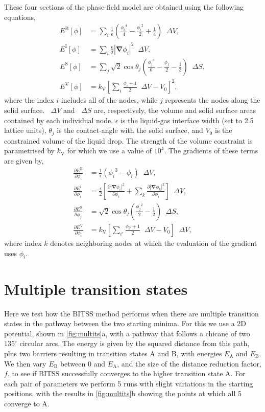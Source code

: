 \documentclass[aip,jcp,11pt]{revtex4-2}
\newcommand{\abs}[1]{\left| #1 \right|}
\newcommand{\grad}{\bm{\nabla}}
\newcommand{\upDelta}{\mathop{}\!\Delta}
\begin{document}
These four sections of the phase-field model are obtained using the following equations,
\begin{align}
  E^\mathrm{B}[\phi] &= \sum_i \frac{1}{\epsilon} \left( \frac{{\phi_i}^4}{4} - \frac{{\phi_i}^2}{2} + \frac{1}{4} \right) \upDelta V,\\
  E^\mathrm{I}[\phi] &= \sum_i \frac{\epsilon}{2} \abs{\grad \phi_i}^2 \upDelta V,\\
  E^\mathrm{S}[\phi] &= \sum_j \sqrt{2}\cos\theta_j \left( \frac{{\phi_j}^3}{6} - \frac{\phi_j}{2} - \frac{1}{3} \right) \upDelta S,\\
  E^\mathrm{V}[\phi] &= k_\mathrm{V} \left[ \sum_i \frac{\phi_i + 1}{2} \upDelta V - V_0 \right]^2,
\end{align}
where the index $i$ includes all of the nodes, while $j$ represents the nodes along the solid surface.
$\upDelta V$ and $\upDelta S$ are, respectively, the volume and solid surface areas contained by each individual node.
$\epsilon$ is the liquid-gas interface width (set to 2.5 lattice units), $\theta_j$ is the contact-angle with the solid surface, and $V_0$ is the constrained volume of the liquid drop.
The strength of the volume constraint is parametrised by $k_\mathrm{V}$ for which we use a value of $10^4$.
The gradients of these terms are given by,
\begin{align}
  \frac{\partial E^\mathrm{B}}{\partial \phi_i} &= \frac{1}{\epsilon} \left( {\phi_i}^3 - \phi_i \right) \upDelta V,\\
  \frac{\partial E^\mathrm{I}}{\partial \phi_i} &= \frac{\epsilon}{2} \left[
    \frac{\partial \abs{\grad \phi_i}^2}{\partial \phi_i} +
    \sum_k\frac{\partial \abs{\grad \phi_k}^2}{\partial \phi_i} \right] \upDelta V,\\
  \frac{\partial E^\mathrm{S}}{\partial \phi_j} &= \sqrt{2}\cos\theta_j \left( \frac{{\phi_j}^2}{2} - \frac{1}{2} \right) \upDelta S,\\
  \frac{\partial E^\mathrm{V}}{\partial \phi_i} &= k_\mathrm{V} \left[ \sum_{i'} \frac{\phi_{i'} + 1}{2} \upDelta V - V_0 \right] \upDelta V,
\end{align}
where index $k$ denotes neighboring nodes at which the evaluation of the gradient uses $\phi_i$.


\section{Multiple transition states}
Here we test how the BITSS method performs when there are multiple transition states in the pathway between the two starting minima.
For this we use a 2D potential, shown in \cref{fig:multits}a, with a pathway that follows a chicane of two $135^\circ$ circular arcs.
The energy is given by the squared distance from this path, plus two barriers resulting in transition states A and B, with energies $E_\text{A}$ and $E_\text{B}$.
We then vary $E_\text{B}$ between 0 and $E_\text{A}$, and the size of the distance reduction factor, $f$, to see if BITSS successfully converges to the higher transition state A.
For each pair of parameters we perform 5 runs with slight variations in the starting positions, with the results in \cref{fig:multits}b showing the points at which all 5 converge to A.
\end{document}

